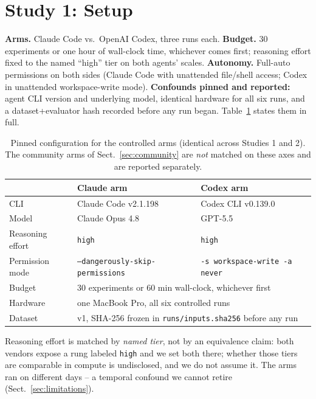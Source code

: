 \documentclass[runningheads]{llncs}
\begin{document}
\section{Study 1: Setup}
\label{sec:study1}

\textbf{Arms.} Claude Code vs.\ OpenAI Codex, three runs each.
\textbf{Budget.} 30 experiments or one hour of wall-clock time, whichever
comes first; reasoning effort fixed to the named ``high'' tier on both
agents' scales. \textbf{Autonomy.} Full-auto permissions on both sides
(Claude Code with unattended file/shell access; Codex in unattended
workspace-write mode). \textbf{Confounds pinned and reported:} agent CLI
version and underlying model, identical hardware for all six runs, and a
dataset+evaluator hash recorded before any run began.
Table~\ref{tab:confounds} states them in full.

\begin{table}[t]
\centering
\caption{Pinned configuration for the controlled arms (identical across
Studies 1 and 2). The community arms of Sect.~\ref{sec:community} are
\emph{not} matched on these axes and are reported separately.}
\label{tab:confounds}
\begin{tabular}{lll}
\toprule
 & Claude arm & Codex arm \\
\midrule
CLI                & Claude Code v2.1.198 & Codex CLI v0.139.0 \\
Model              & Claude Opus 4.8      & GPT-5.5 \\
Reasoning effort   & \texttt{high}        & \texttt{high} \\
Permission mode    & \texttt{--dangerously-skip-permissions}
                   & \texttt{-s workspace-write -a never} \\
Budget             & \multicolumn{2}{l}{30 experiments or 60 min wall-clock,
                      whichever first} \\
Hardware           & \multicolumn{2}{l}{one MacBook Pro, all six controlled runs} \\
Dataset            & \multicolumn{2}{l}{v1, SHA-256 frozen in
                      \texttt{runs/inputs.sha256} before any run} \\
\bottomrule
\end{tabular}
\end{table}

Reasoning effort is matched by \emph{named tier}, not by an equivalence
claim: both vendors expose a rung labeled \texttt{high} and we set both
there; whether those tiers are comparable in compute is undisclosed, and we
do not assume it. The arms ran on different days -- a temporal confound we
cannot retire (Sect.~\ref{sec:limitations}).
\end{document}
